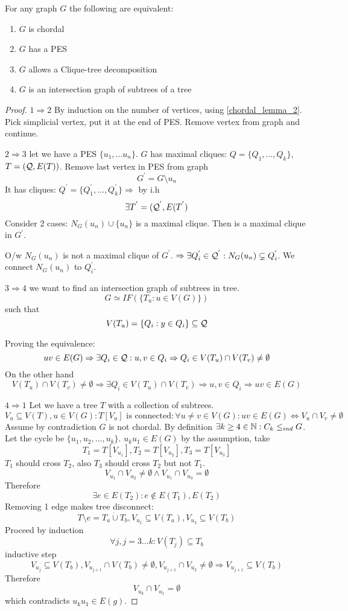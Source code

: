 \begin{theorem}
	For any graph $G$ the following are equivalent:
	\begin{enumerate}
		\item $G$ is chordal
		\item $G$ has a PES
		\item $G$ allows a Clique-tree decomposition
		\item $G$ is an intersection graph of subtrees of a tree
	\end{enumerate}
\end{theorem}
\begin{proof}
	$1 \Rightarrow 2$ By induction on the number of vertices, using \cref{chordal_lemma_2}.
	Pick simplicial vertex, put it at the end of PES.
	Remove vertex from graph and continue.

	$2 \Rightarrow 3$ let we have a PES $\{ u_1, \ldots u_n \}$.
	$G$ has maximal cliques: $Q = \{ Q_1, \ldots, Q_k \}$, $T = (\operatorname{\mathcal{Q}}, E(T))$.
	Remove last vertex in PES from graph
	\[ G^{'} = G \setminus u_n \]
	It has cliques: $Q^{'} = \{ Q_1^{'}, \ldots, Q_k^{'} \} \Rightarrow$ by i.h
	\[ \exists T^{'} = (\operatorname{\mathcal{Q}}^{'}, E(T^{'}) \]
	Consider 2 cases: $N_G(u_n) \cup \{ u_n \}$ is a maximal clique.
	Then is a maximal clique in $G^{'}$.

	O/w $N_G(u_n)$ is not a maximal clique of $G^{'}$.
	$\Rightarrow \exists Q_i^{'} \in \operatorname{\mathcal{Q}}^{'}: N_G(u_n) \subsetneq Q_i^{'}$.
	We connect $N_G(u_n)$ to $Q_i^{'}$.

	$3 \Rightarrow 4$ we want to find an intersection graph of subtrees in tree.
	\[ G \simeq IF(\{T_u: u \in V(G) \}) \]
	such that
	\[ V(T_u) = \{ Q_i: y \in Q_i \} \subseteq \operatorname{\mathcal{Q}} \]

	Proving the equivalence:
	\[ uv \in E(G) \Rightarrow \exists Q_i \in \operatorname{\mathcal{Q}}: u,v \in Q_i \Rightarrow Q_i \in V(T_u) \cap V(T_v) \neq \emptyset \]
	On the other hand
	\[ V(T_u) \cap V(T_v) \neq \emptyset \Rightarrow \exists Q_i \in V(T_u) \cap V(T_v) \Rightarrow u, v \in Q_i \Rightarrow uv \in E(G) \]

	$4 \Rightarrow 1$ Let we have a tree $T$ with a collection of subtrees.
	\[V_u \subseteq V(T), u \in V(G): T[V_u] \text{ is connected}: \forall u \ne v \in V(G): uv \in E(G) \iff V_u \cap V_v \ne \emptyset \]
	Assume by contradiction $G$ is not chordal.
	By definition $\exists k \geq 4 \in \operatorname{\mathbb{N}}: C_k \leq_{ind} G$.
	Let the cycle be $\{ u_1, u_2, \ldots, u_k \}$.
	$u_k u_1 \in E(G)$ by the assumption, take
	\[ T_1 = T[V_{u_1}], T_2 = T[V_{u_2}], T_3 = T[V_{u_3}] \]
	$T_1$ should cross $T_2$, also $T_3$ should cross $T_2$ but not $T_1$.
	\[ V_{u_1} \cap V_{u_2} \ne \emptyset \land V_{u_1} \cap V_{u_3} = \emptyset \]
	Therefore
	\[ \exists e \in E(T_2): e \notin E(T_1), E(T_2) \]
	Removing 1 edge makes tree disconnect:
	\[ T \setminus e = T_a \mathbin{\dot{\cup}} T_b, V_{u_1} \subseteq V(T_a), V_{u_3} \subseteq V(T_b) \]
	Proceed by induction
	\[ \forall j, j = 3 \ldots k: V(T_j) \subseteq T_b \]
	inductive step
	\[ V_{u_j} \subseteq V(T_b), V_{u_{j + 1}} \cap V(T_b) \neq \emptyset, V_{u_{j + 1}} \cap V_{u_2} \ne \emptyset \Rightarrow V_{u_{j + 1}} \subseteq V(T_b)\]
	Therefore
	\[ V_{u_k} \cap V_{u_1} = \emptyset \]
	which contradicts $u_k u_1 \in E(g)$.


\end{proof}
